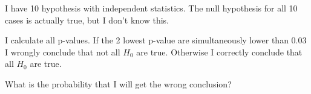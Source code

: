 
\begin{question}
I have 10 hypothesis with independent statistics. The null hypothesis for all 10
cases is actually true, but I don't know this.

I calculate all p-values.
If the 2 lowest p-value are simultaneously lower than 0.03 I wrongly conclude that not all \(H_0\) are true. Otherwise I correctly conclude that all \(H_0\) are true.

What is the probability that I will get the wrong conclusion?
\end{question}


